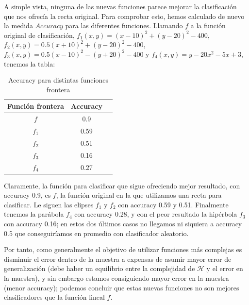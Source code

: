 \documentclass[11pt,a4paper]{article}
\theoremstyle{definition}
\begin{document}
	A simple vista, ninguna de las nuevas funciones parece mejorar la clasificación que nos ofrecía la recta original. Para comprobar esto, hemos calculado de nuevo la medida $Accuracy$ para las diferentes funciones. 
Llamando $f$ a la función original de clasificación, $f_1(x,y)=(x-10)^2+(y-20)^2-400$, $f_2(x,y)=0.5(x+10)^2+(y-20)^2-400$, $f_3(x,y)=0.5(x-10)^2-(y+20)^2-400$ y $f_4(x,y)=y-20x^2-5x+3$, tenemos la tabla:
	
	\begin{table}[H]
	\begin{center}
	\begin{tabular}{|c|c|c|}
	\hline
	Función frontera & Accuracy \\
	\hline \hline
	$f$ & 0.9 \\ \hline
	$f_1$ & 0.59\\ \hline
	$f_2$ & 0.51\\ \hline
	$f_3$ & 0.16\\  \hline
	$f_4$ & 0.27\\ \hline
	\end{tabular}
	\caption{Accuracy para distintas funciones frontera}
	\label{tabla:sencilla}
	\end{center}
	\end{table}
	Claramente, la función para clasificar que sigue ofreciendo mejor resultado, con accuracy 0.9, es $f$, la función original en la que utilizamos una recta para clasificar. Le siguen las elipses $f_1$ y $f_2$ con accuracy 0.59 y 0.51. Finalmente tenemos la parábola $f_4$ con accuracy 0.28, y con el peor resultado la hipérbola $f_3$ con accuracy 0.16; en estos dos últimos casos no llegamos ni siquiera a accuracy 0.5 que conseguiríamos en promedio con clasificador aleatorio.
	
	Por tanto, como generalmente el objetivo de utilizar funciones más complejas es disminuir el error dentro de la muestra a expensas de asumir mayor error de generalización (debe haber un equilibrio entre la complejidad de $\mathcal{H}$ y el error en la muestra), y sin embargo estamos consiguiendo mayor error en la muestra (menor accuracy); podemos concluir que estas nuevas funciones no son mejores clasificadores que la función lineal $f$.
	
\end{document}
